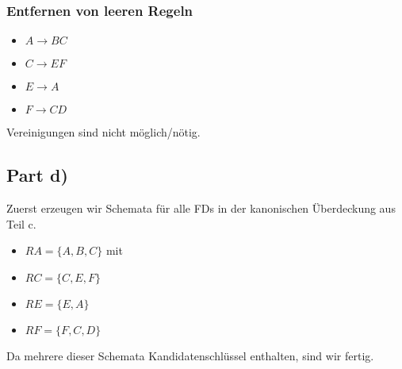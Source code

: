\documentclass[10pt,a4paper]{article}
\begin{document}
\subsubsection*{Entfernen von leeren Regeln}

\begin{itemize}
\item $A \rightarrow BC$
\item $C \rightarrow EF$
\item $E \rightarrow A$
\item $F \rightarrow CD$
\end{itemize}

Vereinigungen sind nicht möglich/nötig.

\subsection*{Part d)}

Zuerst erzeugen wir Schemata für alle FDs in der kanonischen Überdeckung aus Teil c.
\begin{itemize}
\item $RA = \{ A, B, C \}$ mit
\item $RC = \{ C, E, F \}$
\item $RE = \{ E, A \}$
\item $RF = \{ F, C, D \}$
\end{itemize}

Da mehrere dieser Schemata Kandidatenschlüssel enthalten, sind wir fertig.
\end{document}
